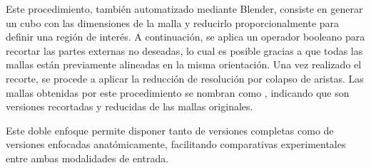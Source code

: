 Este procedimiento, también automatizado mediante Blender, consiste en generar un cubo con las dimensiones de la malla y reducirlo proporcionalmente para definir una región de interés. A continuación, se aplica un operador booleano para recortar las partes externas no deseadas, lo cual es posible gracias a que todas las mallas están previamente alineadas en la misma orientación. Una vez realizado el recorte, se procede a aplicar la reducción de resolución por colapso de aristas. Las mallas obtenidas por este procedimiento se nombran como , indicando que son versiones recortadas y reducidas de las mallas originales.

Este doble enfoque permite disponer tanto de versiones completas como de versiones enfocadas anatómicamente, facilitando comparativas experimentales entre ambas modalidades de entrada.